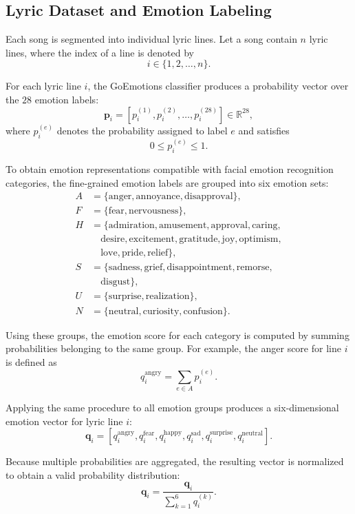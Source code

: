 \documentclass[11pt]{article}
\begin{document}
\subsection{Lyric Dataset and Emotion Labeling}
Each song is segmented into individual lyric lines. Let a song contain $n$ lyric lines, where the index of a line is denoted by
\vspace{-0.25cm}
\[
i \in \{1,2,\dots,n\}.
\]


For each lyric line $i$, the GoEmotions classifier produces a probability vector over the $28$ emotion labels:
\[
\mathbf{p}_i =
\left[
p_i^{(1)}, p_i^{(2)}, \dots, p_i^{(28)}
\right] \in \mathbb{R}^{28},
\]
where $p_i^{(e)}$ denotes the probability assigned to label $e$ and satisfies
\[
0 \le p_i^{(e)} \le 1.
\]

To obtain emotion representations compatible with facial emotion recognition categories, the fine-grained emotion labels are grouped into six emotion sets:
\[
\begin{aligned}
A &= \{\text{anger}, \text{annoyance}, \text{disapproval}\}, \\
F &= \{\text{fear}, \text{nervousness}\}, \\
H &= \{\text{admiration}, \text{amusement}, \text{approval}, \text{caring}, \\
  &\quad \text{desire}, \text{excitement}, \text{gratitude}, \text{joy}, \text{optimism}, \\
  &\quad \text{love}, \text{pride}, \text{relief}\}, \\
S &= \{\text{sadness}, \text{grief}, \text{disappointment}, \text{remorse}, \\
  &\quad \text{disgust}\}, \\
U &= \{\text{surprise}, \text{realization}\}, \\
N &= \{\text{neutral}, \text{curiosity}, \text{confusion}\}.
\end{aligned}
\]

Using these groups, the emotion score for each category is computed by summing probabilities belonging to the same group. For example, the anger score for line $i$ is defined as
\[
q_i^{\text{angry}} =
\sum_{e \in A} p_i^{(e)}.
\]

Applying the same procedure to all emotion groups produces a six-dimensional emotion vector for lyric line $i$:
\[
\mathbf{q}_i =
\left[
q_i^{\text{angry}},
q_i^{\text{fear}},
q_i^{\text{happy}},
q_i^{\text{sad}},
q_i^{\text{surprise}},
q_i^{\text{neutral}}
\right].
\]

Because multiple probabilities are aggregated, the resulting vector is normalized to obtain a valid probability distribution:
\[
\mathbf{q}_i =
\frac{\mathbf{q}_i}
{\sum_{k=1}^{6} q_i^{(k)}}.
\]
\end{document}
